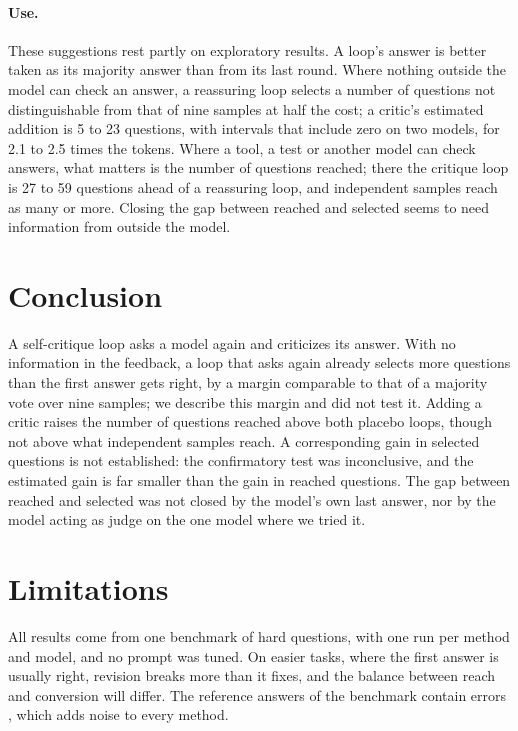 \documentclass[11pt]{article}
\begin{document}
\paragraph{Use.}
These suggestions rest partly on exploratory results.
A loop's answer is better taken as its majority answer than from its last round.
Where nothing outside the model can check an answer, a reassuring loop selects a number of questions not distinguishable from that of nine samples at half the cost; a critic's estimated addition is 5 to 23 questions, with intervals that include zero on two models, for 2.1 to 2.5 times the tokens.
Where a tool, a test or another model can check answers, what matters is the number of questions reached; there the critique loop is 27 to 59 questions ahead of a reassuring loop, and independent samples reach as many or more.
Closing the gap between reached and selected seems to need information from outside the model.

\section{Conclusion}

A self-critique loop asks a model again and criticizes its answer.
With no information in the feedback, a loop that asks again already selects more questions than the first answer gets right, by a margin comparable to that of a majority vote over nine samples; we describe this margin and did not test it.
Adding a critic raises the number of questions reached above both placebo loops, though not above what independent samples reach.
A corresponding gain in selected questions is not established: the confirmatory test was inconclusive, and the estimated gain is far smaller than the gain in reached questions.
The gap between reached and selected was not closed by the model's own last answer, nor by the model acting as judge on the one model where we tried it.

\section*{Limitations}

All results come from one benchmark of hard questions, with one run per method and model, and no prompt was tuned.
On easier tasks, where the first answer is usually right, revision breaks more than it fixes, and the balance between reach and conversion will differ.
The reference answers of the benchmark contain errors \citep{zhai2026hleverified}, which adds noise to every method.
\end{document}
